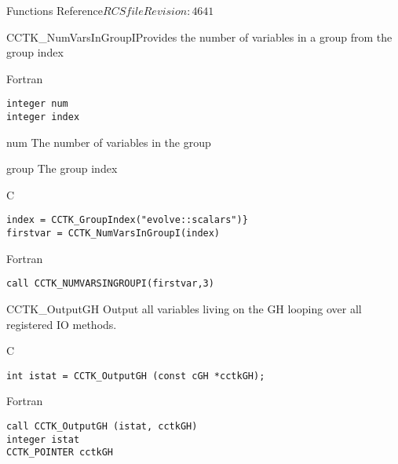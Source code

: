 \begin{cactuspart}{ Functions Reference}{$RCSfile$}{$Revision: 4641 $}
\begin{FunctionDescription}{CCTK\_NumVarsInGroupI}{Provides the number of variables in a group from the group index}
\begin{SynopsisSection}
\begin{Synopsis}{Fortran}
\begin{verbatim}
integer num
integer index\end{verbatim}
\end{Synopsis}
\end{SynopsisSection}
\begin{ParameterSection}
\begin{Parameter}{num}
The number of variables in the group
\end{Parameter}
\begin{Parameter}{group}
The group index
\end{Parameter}
\end{ParameterSection}
\begin{Discussion}

\end{Discussion}
\begin{ExampleSection}
\begin{Example}{C}
\begin{verbatim}
index = CCTK_GroupIndex("evolve::scalars")}
firstvar = CCTK_NumVarsInGroupI(index)
\end{verbatim}
\end{Example}
\begin{Example}{Fortran}
\begin{verbatim}
call CCTK_NUMVARSINGROUPI(firstvar,3)
\end{verbatim}
\end{Example}
\end{ExampleSection}
\end{FunctionDescription}








\begin{FunctionDescription}{CCTK\_OutputGH}
\label{CCTK-OutputGH}
Output all variables living on the GH looping over all registered IO methods.

\begin{SynopsisSection}
\begin{Synopsis}{C}
\begin{verbatim}
int istat = CCTK_OutputGH (const cGH *cctkGH);
\end{verbatim}
\end{Synopsis}
\begin{Synopsis}{Fortran}
\begin{verbatim}
call CCTK_OutputGH (istat, cctkGH)
integer istat
CCTK_POINTER cctkGH
\end{verbatim}
\end{Synopsis}
\end{SynopsisSection}


\end{FunctionDescription}
\end{cactuspart}
